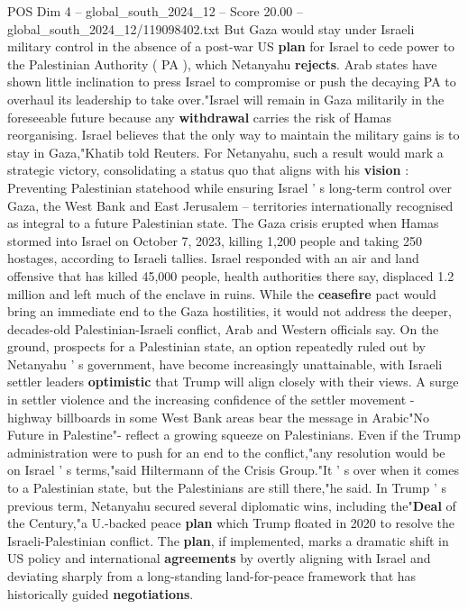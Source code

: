 \begin{textsample}{POS Dim 4 – global\_south\_2024\_12 – Score 20.00 – global\_south\_2024\_12/119098402.txt}
But Gaza would stay under Israeli military control in the absence of a post-war US \textbf{plan} for Israel to cede power to the Palestinian Authority ( PA ), which Netanyahu \textbf{rejects}.
Arab states have shown little inclination to press Israel to compromise or push the decaying PA to overhaul its leadership to take over."Israel will remain in Gaza militarily in the foreseeable future because any \textbf{withdrawal} carries the risk of Hamas reorganising.
Israel believes that the only way to maintain the military gains is to stay in Gaza,"Khatib told Reuters.
For Netanyahu, such a result would mark a strategic victory, consolidating a status quo that aligns with his \textbf{vision} : Preventing Palestinian statehood while ensuring Israel ' s long-term control over Gaza, the West Bank and East Jerusalem -- territories internationally recognised as integral to a future Palestinian state.
The Gaza crisis erupted when Hamas stormed into Israel on October 7, 2023, killing 1,200 people and taking 250 hostages, according to Israeli tallies.
Israel responded with an air and land offensive that has killed 45,000 people, health authorities there say, displaced 1.2 million and left much of the enclave in ruins.
While the \textbf{ceasefire} pact would bring an immediate end to the Gaza hostilities, it would not address the deeper, decades-old Palestinian-Israeli conflict, Arab and Western officials say.
On the ground, prospects for a Palestinian state, an option repeatedly ruled out by Netanyahu ' s government, have become increasingly unattainable, with Israeli settler leaders \textbf{optimistic} that Trump will align closely with their views.
A surge in settler violence and the increasing confidence of the settler movement - highway billboards in some West Bank areas bear the message in Arabic"No Future in Palestine"- reflect a growing squeeze on Palestinians.
Even if the Trump administration were to push for an end to the conflict,"any resolution would be on Israel ' s terms,"said Hiltermann of the Crisis Group."It ' s over when it comes to a Palestinian state, but the Palestinians are still there,"he said.
In Trump ' s previous term, Netanyahu secured several diplomatic wins, including the"\textbf{Deal} of the Century,"a U.-backed peace \textbf{plan} which Trump floated in 2020 to resolve the Israeli-Palestinian conflict.
The \textbf{plan}, if implemented, marks a dramatic shift in US policy and international \textbf{agreements} by overtly aligning with Israel and deviating sharply from a long-standing land-for-peace framework that has historically guided \textbf{negotiations}.

\end{textsample}
